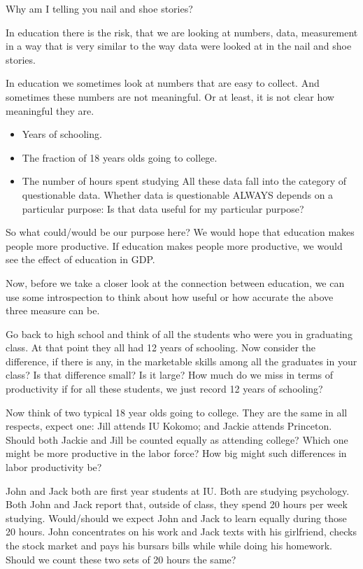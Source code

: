 \documentclass[
]{book}
\providecommand{\tightlist}{%
  \setlength{\itemsep}{0pt}\setlength{\parskip}{0pt}}
\begin{document}
Why am I telling you nail and shoe stories?

In education there is the risk, that we are looking at numbers, data, measurement in a way that is very similar to the way data were looked at in the nail and shoe stories.

In education we sometimes look at numbers that are easy to collect. And sometimes these numbers are not meaningful. Or at least, it is not clear how meaningful they are.

\begin{itemize}
\tightlist
\item
  Years of schooling.
\item
  The fraction of 18 years olds going to college.
\item
  The number of hours spent studying
  All these data fall into the category of questionable data. Whether data is questionable ALWAYS depends on a particular purpose: Is that data useful for my particular purpose?
\end{itemize}

So what could/would be our purpose here? We would hope that education makes people more productive. If education makes people more productive, we would see the effect of education in GDP.

Now, before we take a closer look at the connection between education, we can use some introspection to think about how useful or how accurate the above three measure can be.

Go back to high school and think of all the students who were you in graduating class. At that point they all had 12 years of schooling. Now consider the difference, if there is any, in the marketable skills among all the graduates in your class? Is that difference small? Is it large? How much do we miss in terms of productivity if for all these students, we just record 12 years of schooling?

Now think of two typical 18 year olds going to college. They are the same in all respects, expect one: Jill attends IU Kokomo; and Jackie attends Princeton. Should both Jackie and Jill be counted equally as attending college? Which one might be more productive in the labor force? How big might such differences in labor productivity be?

John and Jack both are first year students at IU. Both are studying psychology. Both John and Jack report that, outside of class, they spend 20 hours per week studying. Would/should we expect John and Jack to learn equally during those 20 hours. John concentrates on his work and Jack texts with his girlfriend, checks the stock market and pays his bursars bills while while doing his homework. Should we count these two sets of 20 hours the same?
\end{document}
